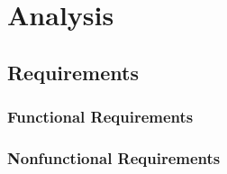 \chapter{Analysis}
\label{chap:analysis}


\section{Requirements}
\label{sec:requirements}
\subsection{Functional Requirements}
\label{subsec:functional-requirements}

\subsection{Nonfunctional Requirements}
\label{subsec:nonfunctional-requirements}


